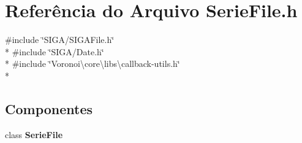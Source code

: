 \section{Referência do Arquivo Serie\+File.\+h}
\label{_serie_file_8h}
{\ttfamily \#include \char`\"{}S\+I\+G\+A/\+S\+I\+G\+A\+File.\+h\char`\"{}}\\*
{\ttfamily \#include \char`\"{}S\+I\+G\+A/\+Date.\+h\char`\"{}}\\*
{\ttfamily \#include \char`\"{}Voronoi\textbackslash{}core\textbackslash{}libs\textbackslash{}callback-\/utils.\+h\char`\"{}}\\*
\subsection*{Componentes}
\begin{DoxyCompactItemize}
\item 
class {\bf Serie\+File}
\end{DoxyCompactItemize}
